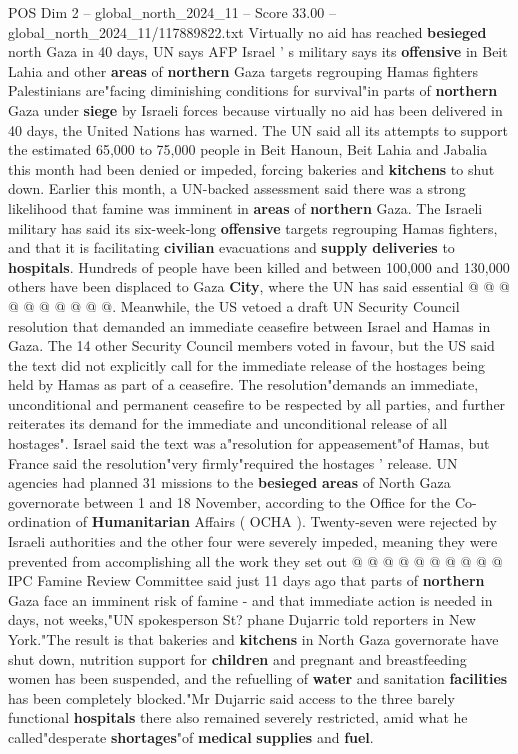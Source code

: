 \begin{textsample}{POS Dim 2 – global\_north\_2024\_11 – Score 33.00 – global\_north\_2024\_11/117889822.txt}  \label{ex:f2_pos_353}
Virtually no aid has reached \textbf{besieged} north Gaza in 40 days, UN says AFP Israel ' s military says its \textbf{offensive} in Beit Lahia and other \textbf{areas} of \textbf{northern} Gaza targets regrouping Hamas fighters Palestinians are"facing diminishing conditions for survival"in parts of \textbf{northern} Gaza under \textbf{siege} by Israeli forces because virtually no aid has been delivered in 40 days, the United Nations has warned.
The UN said all its attempts to support the estimated 65,000 to 75,000 people in Beit Hanoun, Beit Lahia and Jabalia this month had been denied or impeded, forcing bakeries and \textbf{kitchens} to shut down.
Earlier this month, a UN-backed assessment said there was a strong likelihood that famine was imminent in \textbf{areas} of \textbf{northern} Gaza.
The Israeli military has said its six-week-long \textbf{offensive} targets regrouping Hamas fighters, and that it is facilitating \textbf{civilian} evacuations and \textbf{supply} \textbf{deliveries} to \textbf{hospitals}.
Hundreds of people have been killed and between 100,000 and 130,000 others have been displaced to Gaza \textbf{City}, where the UN has said essential @ @ @ @ @ @ @ @ @ @.
Meanwhile, the US vetoed a draft UN Security Council resolution that demanded an immediate ceasefire between Israel and Hamas in Gaza.
The 14 other Security Council members voted in favour, but the US said the text did not explicitly call for the immediate release of the hostages being held by Hamas as part of a ceasefire.
The resolution"demands an immediate, unconditional and permanent ceasefire to be respected by all parties, and further reiterates its demand for the immediate and unconditional release of all hostages".
Israel said the text was a"resolution for appeasement"of Hamas, but France said the resolution"very firmly"required the hostages ' release.
UN agencies had planned 31 missions to the \textbf{besieged} \textbf{areas} of North Gaza governorate between 1 and 18 November, according to the Office for the Co-ordination of \textbf{Humanitarian} Affairs ( OCHA ).
Twenty-seven were rejected by Israeli authorities and the other four were severely impeded, meaning they were prevented from accomplishing all the work they set out @ @ @ @ @ @ @ @ @ @ IPC Famine Review Committee said just 11 days ago that parts of \textbf{northern} Gaza face an imminent risk of famine - and that immediate action is needed in days, not weeks,"UN spokesperson St? phane Dujarric told reporters in New York."The result is that bakeries and \textbf{kitchens} in North Gaza governorate have shut down, nutrition support for \textbf{children} and pregnant and breastfeeding women has been suspended, and the refuelling of \textbf{water} and sanitation \textbf{facilities} has been completely blocked."Mr Dujarric said access to the three barely functional \textbf{hospitals} there also remained severely restricted, amid what he called"desperate \textbf{shortages}"of \textbf{medical} \textbf{supplies} and \textbf{fuel}.

\end{textsample}
